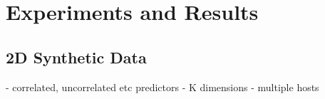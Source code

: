 \section{Experiments and Results}
\subsection{2D Synthetic Data}
\noindent - correlated, uncorrelated etc predictors
- K dimensions
- multiple hosts